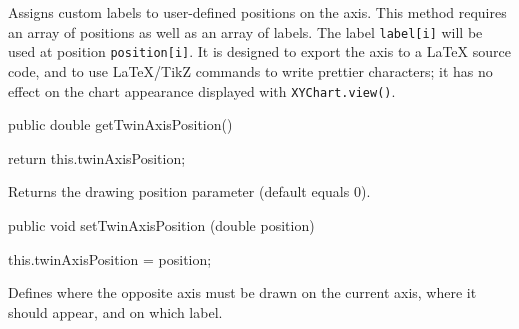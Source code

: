 \begin{tabb}
  Assigns custom labels to user-defined positions on the axis.
  This method requires an array of positions as well as an array of labels.
  The label \texttt{label[i]} will be used at position \texttt{position[i]}.
   It is designed to export the axis to a LaTeX source code,
  and to use \LaTeX/TikZ commands to write prettier characters; it has no
  effect on the chart appearance displayed with \texttt{XYChart.view()}.
\end{tabb}
\begin{htmlonly}
\end{htmlonly}
\begin{code}

   public double getTwinAxisPosition() \begin{hide} {
      return this.twinAxisPosition;
   }\end{hide}
\end{code}
\begin{tabb}
   Returns the drawing position parameter (default equals 0).
\end{tabb}
\begin{htmlonly}
\end{htmlonly}
\begin{code}

   public void setTwinAxisPosition (double position) \begin{hide} {
      this.twinAxisPosition = position;
   }\end{hide}
\end{code}
\begin{tabb}
   Defines where the opposite axis must be drawn on the current axis,
   where it should appear, and on which label.
\end{tabb}
\begin{htmlonly}
\end{htmlonly}
